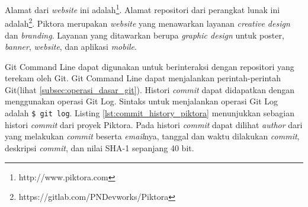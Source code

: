Alamat dari \textit{website} ini adalah\footnote{http://www.piktora.com}. Alamat repositori dari perangkat lunak ini adalah\footnote{https://gitlab.com/PNDevworks/Piktora}. Piktora merupakan \textit{website} yang menawarkan layanan \textit{creative design} dan \textit{branding}. Layanan yang ditawarkan berupa \textit{graphic design} untuk poster, \textit{banner}, \textit{website}, dan aplikasi \textit{mobile}. 

Git Command Line dapat digunakan untuk berinteraksi dengan repositori yang terekam oleh Git. Git Command Line dapat menjalankan perintah-perintah Git(lihat \ref{subsec:operasi_dasar_git}). Histori \textit{commit} dapat didapatkan dengan menggunakan operasi Git Log. Sintaks untuk menjalankan operasi Git Log adalah \texttt{\$ git log}. Listing \ref{lst:commit_history_piktora} menunjukkan sebagian histori \textit{commit} dari proyek Piktora. Pada histori \textit{commit} dapat dilihat \textit{author} dari yang melakukan \textit{commit} beserta \textit{email}nya, tanggal dan waktu dilakukan \textit{commit}, deskripsi \textit{commit}, dan nilai SHA-1 sepanjang 40 bit. 

